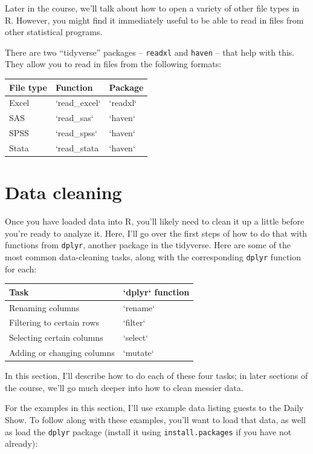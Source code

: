 \documentclass[]{book}
\theoremstyle{definition}
\theoremstyle{definition}
\theoremstyle{definition}
\theoremstyle{remark}
\begin{document}
Later in the course, we'll talk about how to open a variety of other
file types in R. However, you might find it immediately useful to be
able to read in files from other statistical programs.

There are two ``tidyverse'' packages -- \texttt{readxl} and
\texttt{haven} -- that help with this. They allow you to read in files
from the following formats:

\begin{tabular}{l|l|l}
\hline
File type & Function & Package\\
\hline
Excel & `read\_excel` & `readxl`\\
\hline
SAS & `read\_sas` & `haven`\\
\hline
SPSS & `read\_spss` & `haven`\\
\hline
Stata & `read\_stata & `haven`\\
\hline
\end{tabular}

\section{Data cleaning}\label{data-cleaning}

Once you have loaded data into R, you'll likely need to clean it up a
little before you're ready to analyze it. Here, I'll go over the first
steps of how to do that with functions from \texttt{dplyr}, another
package in the tidyverse. Here are some of the most common data-cleaning
tasks, along with the corresponding \texttt{dplyr} function for each:

\begin{tabular}{l|l}
\hline
Task & `dplyr` function\\
\hline
Renaming columns & `rename`\\
\hline
Filtering to certain rows & `filter`\\
\hline
Selecting certain columns & `select`\\
\hline
Adding or changing columns & `mutate`\\
\hline
\end{tabular}

In this section, I'll describe how to do each of these four tasks; in
later sections of the course, we'll go much deeper into how to clean
messier data.

For the examples in this section, I'll use example data listing guests
to the Daily Show. To follow along with these examples, you'll want to
load that data, as well as load the \texttt{dplyr} package (install it
using \texttt{install.packages} if you have not already):
\end{document}
